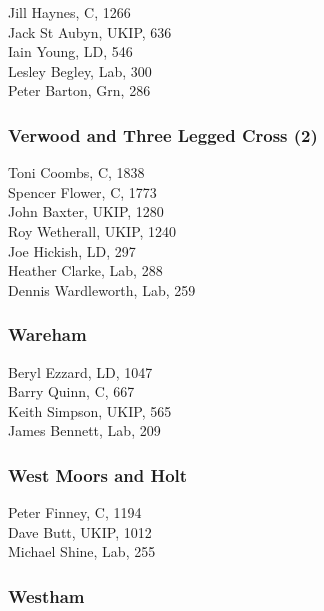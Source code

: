 \documentclass[a4paper,openany,10pt]{book}
\begin{document}


Jill Haynes, C, 1266\\
Jack St Aubyn, UKIP, 636\\
Iain Young, LD, 546\\
Lesley Begley, Lab, 300\\
Peter Barton, Grn, 286\\


\subsubsection*{Verwood and Three Legged Cross (2)}



Toni Coombs, C, 1838\\
Spencer Flower, C, 1773\\
John Baxter, UKIP, 1280\\
Roy Wetherall, UKIP, 1240\\
Joe Hickish, LD, 297\\
Heather Clarke, Lab, 288\\
Dennis Wardleworth, Lab, 259\\


\subsubsection*{Wareham}



Beryl Ezzard, LD, 1047\\
Barry Quinn, C, 667\\
Keith Simpson, UKIP, 565\\
James Bennett, Lab, 209\\


\subsubsection*{West Moors and Holt}



Peter Finney, C, 1194\\
Dave Butt, UKIP, 1012\\
Michael Shine, Lab, 255\\


\subsubsection*{Westham}
\end{document}
